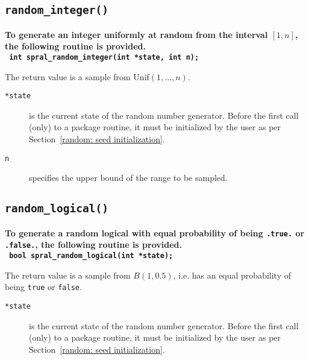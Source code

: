 \subsection{\texttt{random\_integer()}}

\textbf{\noindent
   To generate an integer uniformly at random from the interval $[1,n]$, the
   following routine is provided.
   \vspace*{0.1cm} \\
   \texttt{ \hspace*{0.2cm}
      int spral\_random\_integer(int *state, int n);
   }
   \vspace{0.3cm}
}

\noindent
The return value is a sample from $\mathrm{Unif}(1, \ldots, n)$.

\begin{description}

\item[\texttt{*state}] is the current state of the random number generator.
   Before the first call (only) to a package routine, it must be initialized by
   the user as per Section~\ref{random: seed initialization}.

\item[\texttt{n}] specifies the upper bound of the range to be sampled.

\end{description}

\subsection{\texttt{random\_logical()}}

\textbf{\noindent
   To generate a random logical with equal probability of being \texttt{.true.} or \texttt{.false.}, the following routine is provided.
   \vspace*{0.1cm} \\
   \texttt{ \hspace*{0.2cm}
      bool spral\_random\_logical(int *state);
   }
   \vspace{0.3cm}
}

\noindent
The return value is a sample from $B(1,0.5)$, i.e. has an equal probability of
being {\tt true} or {\tt false}.

\begin{description}

\item[\texttt{*state}] is the current state of the random number generator.
   Before the first call (only) to a package routine, it must be initialized by
   the user as per Section~\ref{random: seed initialization}.

\end{description}

